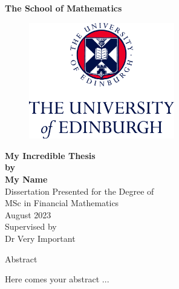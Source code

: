 \documentclass[11pt,twoside]{article}
\numberwithin{Theorem}{section}
\numberwithin{Definition}{section}
\numberwithin{Lemma}{section}
\numberwithin{Algorithm}{section}
\numberwithin{equation}{section}
\begin{document}
\pagestyle{empty}

\begin{titlepage}
\vspace*{.5em}
\center
\textbf{\large{The School of Mathematics\\}}
\vspace*{1em}
\begin{figure}[!h]
\centering
\includegraphics[width=180pt]{CentredLogoCMYK.jpg}
\end{figure}
\vspace{2em}
\textbf{\Huge{My Incredible Thesis}}\\[2em]
\textbf{\LARGE{by}}\\
\vspace{2em}
\textbf{\LARGE{My Name}}\\
\vspace{6.5em}
\Large{Dissertation Presented for the Degree of\\
MSc in Financial Mathematics}\\
\vspace{6.5em}
\Large{August 2023}\\
\vspace{3em}
\Large{Supervised by\\Dr Very Important}
\vfill
\end{titlepage}

\cleardoublepage

\begin{center}
\Large{Abstract}
\end{center}

Here comes your abstract ...

\clearpage
\end{document}
